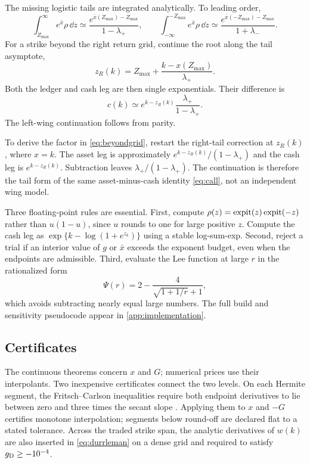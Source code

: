 The missing logistic tails are integrated analytically.  To leading order,
\begin{equation}
\int_{Z_{\max}}^\infty e^{\bar x}\rho\,\dd z
\simeq\frac{e^{\bar x(Z_{\max})-Z_{\max}}}{1-\lambda_+},
\qquad
\int_{-\infty}^{-Z_{\max}}e^{\bar x}\rho\,\dd z
\simeq\frac{e^{\bar x(-Z_{\max})-Z_{\max}}}{1+\lambda_-}.
\label{eq:tailcorr}
\end{equation}
For a strike beyond the right return grid, continue the root along the tail
asymptote,
\[
z_R(k)=Z_{\max}+\frac{k-x(Z_{\max})}{\lambda_+}.
\]
Both the ledger and cash leg are then single exponentials.  Their difference
is
\begin{equation}
c(k)\simeq e^{k-z_R(k)}\frac{\lambda_+}{1-\lambda_+}.
\label{eq:beyondgrid}
\end{equation}
The left-wing continuation follows from parity.

To derive the factor in \eqref{eq:beyondgrid}, restart the right-tail
correction at $z_R(k)$, where $x=k$.  The asset leg is approximately
$e^{k-z_R(k)}/(1-\lambda_+)$ and the cash leg is $e^{k-z_R(k)}$.
Subtraction leaves $\lambda_+/(1-\lambda_+)$.  The continuation is therefore
the tail form of the same asset-minus-cash identity \eqref{eq:call}, not an
independent wing model.

Three floating-point rules are essential.  First, compute
$\rho(z)=\operatorname{expit}(z)\operatorname{expit}(-z)$ rather than $u(1-u)$, since $u$ rounds to one
for large positive $z$.  Compute the cash leg as
$\exp\{k-\log(1+e^{z_k})\}$ using a stable log-sum-exp.  Second, reject a
trial if an interior value of $g$ or $\bar x$ exceeds the exponent budget,
even when the endpoints are admissible.  Third, evaluate the Lee function at
large $r$ in the rationalized form
\begin{equation}
\Psi(r)=2-\frac4{\sqrt{1+1/r}+1},
\label{eq:leestable}
\end{equation}
which avoids subtracting nearly equal large numbers.  The full build and
sensitivity pseudocode appear in \cref{app:implementation}.

\subsection{Certificates}
\label{sec:certificates}

The continuous theorems concern $x$ and $G$; numerical prices use their
interpolants.  Two inexpensive certificates connect the two levels.  On each
Hermite segment, the Fritsch--Carlson inequalities require both endpoint
derivatives to lie between zero and three times the secant slope
\citep{FritschCarlson1980}.  Applying them to $x$ and $-G$ certifies monotone
interpolation; segments below round-off are declared flat to a stated
tolerance.  Across the traded strike span, the analytic derivatives of
$w(k)$ are also inserted in \eqref{eq:durrleman} on a dense grid and required
to satisfy $g_{\rm D}\ge-10^{-4}$.

